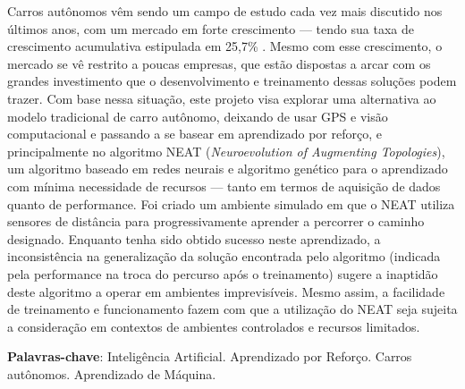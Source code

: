 \setlength{\absparsep}{18pt} %
\begin{resumo}
	Carros autônomos v{\^e}m sendo um campo de estudo cada vez mais discutido
	nos {\'u}ltimos anos, com um mercado em forte crescimento — tendo sua taxa
	de crescimento acumulativa estipulada em 25,7\% \cite{globe2022}. Mesmo com
	esse crescimento, o mercado se v{\^e} restrito a poucas empresas, que
	est{\~a}o dispostas a arcar com os grandes investimento que o
	desenvolvimento e treinamento dessas solu{\c c}{\~o}es podem trazer. Com
	base nessa situa{\c c}{\~a}o, este projeto visa explorar uma alternativa ao
	modelo tradicional de carro aut{\^o}nomo, deixando de usar GPS e vis{\~a}o
	computacional e passando a se basear em aprendizado por refor{\c c}o, e
	principalmente no algoritmo NEAT (\textit{Neuroevolution of Augmenting
	Topologies}), um algoritmo baseado em redes neurais e algoritmo
	gen{\'e}tico para o aprendizado com m{\'i}nima necessidade de recursos —
	tanto em termos de aquisi{\c c}{\~a}o de dados quanto de performance. Foi
	criado um ambiente simulado em que o NEAT utiliza sensores de
	dist{\^a}ncia para progressivamente aprender a percorrer o caminho
	designado. Enquanto tenha sido obtido sucesso neste aprendizado, a
	inconsist{\^e}ncia na generaliza{\c c}{\~a}o da solu{\c c}{\~a}o encontrada
	pelo algoritmo (indicada pela performance na troca do percurso ap{\'o}s o
	treinamento) sugere a inaptid{\~a}o deste algoritmo a operar em ambientes
	imprevis{\'i}veis. Mesmo assim, a facilidade de treinamento e funcionamento
	fazem com que a utiliza{\c c}{\~a}o do NEAT seja sujeita a considera{\c
	c}{\~a}o em contextos de ambientes controlados e recursos limitados.

	\textbf{Palavras-chave}: Intelig{\^e}ncia Artificial. Aprendizado por Refor{\c c}o. Carros aut{\^o}nomos. Aprendizado de M{\'a}quina.
\end{resumo}

